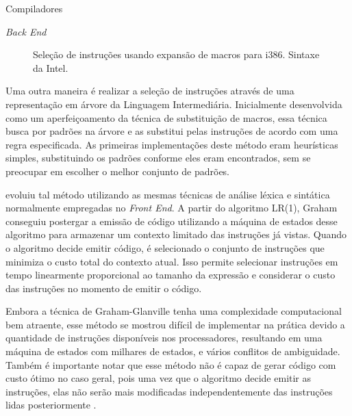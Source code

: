 \begin{section}{Compiladores}
\begin{subsection}{\textit{Back End}}
\begin{figure}
\begin{center}
{
}
\end{center}

\caption{Seleção de instruções usando expansão de macros para i386. Sintaxe da Intel.}
\label{fig:macro_exp}
\end{figure}

Uma outra maneira é realizar a seleção de instruções através de uma
representação em árvore da Linguagem Intermediária.  Inicialmente
desenvolvida como um aperfeiçoamento da técnica de substituição de macros,
essa técnica busca por padrões na árvore e as substitui pelas instruções de
acordo com uma regra especificada.  As primeiras implementações deste
método eram heurísticas simples, substituindo os padrões conforme eles eram
encontrados, sem se preocupar em escolher o melhor conjunto de padrões.

\cite{glanville1978} evoluiu tal método utilizando as mesmas técnicas de
análise léxica e sintática normalmente empregadas no \textit{Front End}. A
partir do algoritmo LR(1), Graham conseguiu postergar a emissão de código
utilizando a máquina de estados desse algoritmo para armazenar um contexto
limitado das instruções já vistas. Quando o algoritmo decide emitir código,
é selecionado o conjunto de instruções que minimiza o custo total do
contexto atual. Isso permite selecionar instruções em tempo linearmente
proporcional ao tamanho da expressão e considerar o custo das instruções no
momento de emitir o código.

Embora a técnica de Graham-Glanville tenha uma complexidade computacional bem
atraente, esse método se mostrou difícil de implementar na prática devido a
quantidade de instruções disponíveis nos processadores, resultando em uma
máquina de estados com milhares de estados, e vários conflitos de ambiguidade.
Também é importante notar que esse método não é capaz de gerar código com custo
ótimo no caso geral, pois uma vez que o algoritmo decide emitir as instruções,
elas não serão mais modificadas independentemente das instruções lidas
posteriormente \citep{blindell2016instruction}.


\end{subsection}
\end{section}
